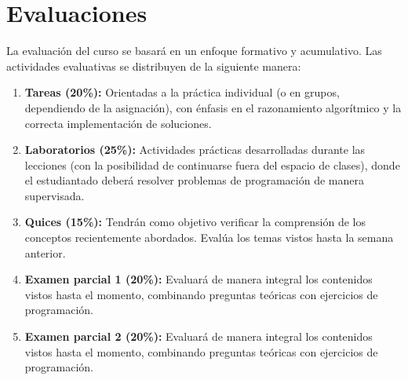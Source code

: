 \section{Evaluaciones}

La evaluación del curso se basará en un enfoque formativo y acumulativo.
Las actividades evaluativas se distribuyen de la siguiente manera:

\begin{enumerate}
  \item \textbf{Tareas (20\%):} Orientadas a la práctica individual (o en grupos, dependiendo de la asignación), con énfasis en el razonamiento algorítmico y la correcta implementación de soluciones.
  \item \textbf{Laboratorios (25\%):} Actividades prácticas desarrolladas durante las lecciones (con la posibilidad de continuarse fuera del espacio de clases), donde el estudiantado deberá resolver problemas de programación de manera supervisada.
  \item \textbf{Quices (15\%):} Tendrán como objetivo verificar la comprensión de los conceptos recientemente abordados. Evalúa los temas vistos hasta la semana anterior.
  \item \textbf{Examen parcial 1 (20\%):} Evaluará de manera integral los contenidos vistos hasta el momento, combinando preguntas teóricas con ejercicios de programación.
  \item \textbf{Examen parcial 2 (20\%):} Evaluará de manera integral los contenidos vistos hasta el momento, combinando preguntas teóricas con ejercicios de programación.
\end{enumerate}
